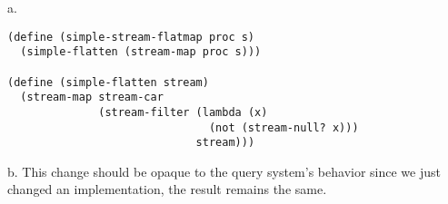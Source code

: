 \documentclass[a4paper,12pt]{article}
\newcommand{\subpar}[1]{\medskip \noindent #1.}
\begin{document}
\subpar{a}
\begin{lstlisting}
(define (simple-stream-flatmap proc s)
  (simple-flatten (stream-map proc s)))

(define (simple-flatten stream)
  (stream-map stream-car
              (stream-filter (lambda (x)
                               (not (stream-null? x)))
                             stream)))
\end{lstlisting}

\subpar{b} This change should be opaque to the query system's behavior
since we just changed an implementation, the result remains the same.
\end{document}
